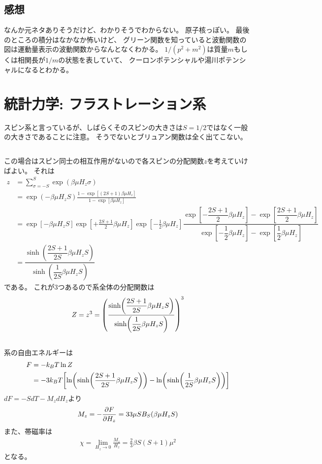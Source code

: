 \documentclass[../../master.tex]{subfiles}
\begin{document}
\subsection*{感想}
なんか元ネタありそうだけど、わかりそうでわからない。
原子核っぽい。
最後のところの積分はなかなか怖いけど、
グリーン関数を知っていると波動関数の図は運動量表示の波動関数からなんとなくわかる。
\(1/(p^2+m^2)\)は質量\(m\)もしくは相関長が\(1/m\)の状態を表していて、
クーロンポテンシャルや湯川ポテンシャルになるとわかる。

\section{統計力学: フラストレーション系}
スピン系と言っているが、しばらくそのスピンの大きさは\(S=1/2\)ではなく一般の大きさであることに注意。
そうでないとブリュアン関数は全く出てこない。
\subsection{}
この場合はスピン同士の相互作用がないので各スピンの分配関数\(z\)を考えていけばよい。
それは
\begin{align}
    z
    &= \sum_{\sigma=-S}^{S}\exp(\beta\mu H_z\sigma)\\
    &= \exp(-\beta\mu H_z S)\frac{1-\exp[(2S+1)\beta\mu H_z]}{1-\exp[\beta\mu H_z]}\\
    &= \exp[-\beta\mu H_z S]\exp[+\frac{2S+1}{2}\beta\mu H_z]\exp[-\frac{1}{2}\beta\mu H_z]
        \dfrac{\exp[-\dfrac{2S+1}{2}\beta\mu H_z]-\exp[\dfrac{2S+1}{2}\beta\mu H_z]}{\exp[-\dfrac{1}{2}\beta\mu H_z]-\exp[\dfrac{1}{2}\beta\mu H_z]}\\
    &=\dfrac{\sinh(\dfrac{2S+1}{2S}\beta\mu H_z S)}{\sinh(\dfrac{1}{2S}\beta\mu H_z S)}
\end{align}
である。
これが3つあるので系全体の分配関数は
\begin{align}
    Z = z^3 = \qty(\dfrac{\sinh(\dfrac{2S+1}{2S}\beta\mu H_z S)}{\sinh(\dfrac{1}{2S}\beta\mu H_z S)})^3
\end{align}

\subsection{}
系の自由エネルギーは
\begin{align}
    F &= -k_B T \ln Z\\
    &= -3k_B T \qty[\ln(\sinh(\dfrac{2S+1}{2S}\beta\mu H_z S))-\ln(\sinh(\dfrac{1}{2S}\beta\mu H_z S))]
\end{align}
\(dF = -S dT-M_z dH_z\)より
\begin{align}
    M_z = -\pdv{F}{H_z} = 33\mu S B_S(\beta\mu H_z S)
\end{align}
また、帯磁率は
\begin{align}
    \chi = \lim_{H_z\to 0} \frac{M_z}{H_z} = \frac{2}{3}\beta S(S+1)\mu^2
\end{align}
となる。
\end{document}
